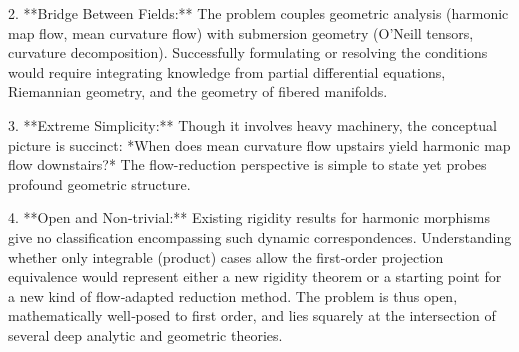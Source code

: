 2. **Bridge Between Fields:**  
   The problem couples geometric analysis (harmonic map flow, mean curvature flow) with submersion geometry (O’Neill tensors, curvature decomposition). Successfully formulating or resolving the conditions would require integrating knowledge from partial differential equations, Riemannian geometry, and the geometry of fibered manifolds.  

3. **Extreme Simplicity:**  
   Though it involves heavy machinery, the conceptual picture is succinct: *When does mean curvature flow upstairs yield harmonic map flow downstairs?*  The flow-reduction perspective is simple to state yet probes profound geometric structure.  

4. **Open and Non‑trivial:**  
   Existing rigidity results for harmonic morphisms give no classification encompassing such dynamic correspondences. Understanding whether only integrable (product) cases allow the first‑order projection equivalence would represent either a new rigidity theorem or a starting point for a new kind of flow‑adapted reduction method.  
   The problem is thus open, mathematically well‑posed to first order, and lies squarely at the intersection of several deep analytic and geometric theories.